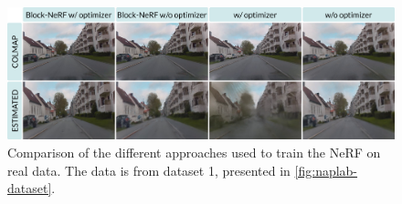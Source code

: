 \begin{figure}[H]
    \centering
    \includegraphics[width=1.0\textwidth]{figures/trip086-comparison.png}
    \caption[Different approaches used to train the NeRF on real data]{Comparison of the different approaches used to train the NeRF on real data. The data is from dataset 1, presented in \autoref{fig:naplab-dataset}.}
    \label{fig:trip086-comparison}
\end{figure}